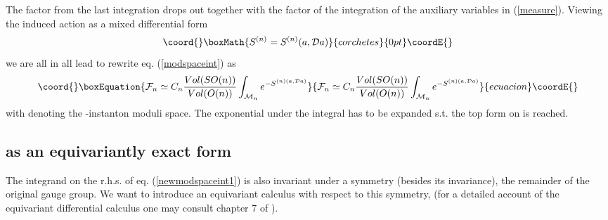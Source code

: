 \documentclass[a4paper,12pt]{article}
\begin{document}
The factor \coordHE{} from the last integration drops out 
together with the \coordHE{} factor of the integration 
of the auxiliary variables \coordHE{} in (\ref{measure}).
Viewing the induced action \coordHE{} as a  mixed differential form 
\[\coord{}\boxMath{ S^{(n)}=S^{(n)}(a,{\cal D}a) }{corchetes}{0pt}\coordE{}\]
we are all in all lead to rewrite eq. (\ref{modspaceint}) as 
\begin{equation}\coord{}\boxEquation{
{\cal F}_n\simeq C_n \frac{Vol(SO(n))}{Vol(O(n))}
\int_{{\cal M}_n} e^{-S^{(n)(a,{\cal D}a)}}
\label{newmodspaceint1}
}{
{\cal F}_n\simeq C_n \frac{Vol(SO(n))}{Vol(O(n))}
\int_{{\cal M}_n} e^{-S^{(n)(a,{\cal D}a)}}
}{ecuacion}\coordE{}\end{equation}         
with \coordHE{} denoting the \coordHE{}-instanton moduli space. The 
exponential under the integral has to be expanded s.t. the top 
form on \coordHE{} is reached. 
     
\subsection{\coordHE{} as an equivariantly exact form}

The integrand on the r.h.s. of eq. (\ref{newmodspaceint1}) is also 
invariant under a \coordHE{} symmetry (besides its \coordHE{} invariance), 
the remainder of the original \coordHE{} gauge group. We want to introduce 
an equivariant calculus with respect to this \coordHE{} symmetry, (for a 
detailed account of the equivariant differential calculus one may 
consult chapter 7 of \cite{berline}). 
\end{document}

